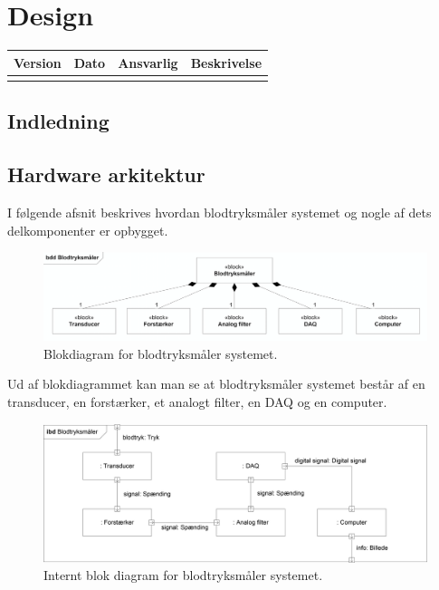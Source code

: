 \chapter{Design}

\begin{longtabu} to 
    Version &    Dato &    Ansvarlig &    Beskrivelse\\[-1ex]
    \midrule
    
\label{version_Systemark}
\end{longtabu}

\section{Indledning}

  
\section{Hardware arkitektur}
I følgende afsnit beskrives hvordan blodtryksmåler systemet og nogle af dets delkomponenter er opbygget.
\\
\begin{figure}[H]
	\centering
	\includegraphics[width=1\textwidth]{Figurer/BDD}
	\caption{Blokdiagram for blodtryksmåler systemet.}\label{labelpic}
\end{figure}

Ud af blokdiagrammet kan man se at blodtryksmåler systemet består af en transducer, en forstærker, et analogt filter, en DAQ og en computer.\\
\begin{figure}[H]
	\centering
	\includegraphics[width=1\textwidth]{Figurer/IBD}
	\caption{Internt blok diagram for blodtryksmåler systemet.}\label{labelpic}
\end{figure}

